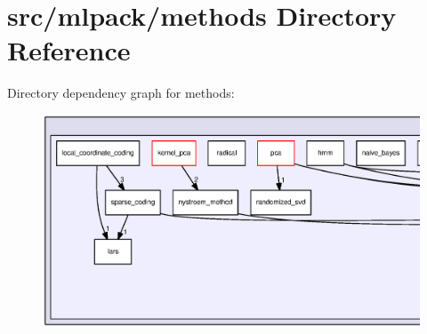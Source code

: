 \section{src/mlpack/methods Directory Reference}
\label{dir_3cfbf900288ec2fe8dd2c2c8482f216e}
Directory dependency graph for methods\+:
\nopagebreak
\begin{figure}[H]
\begin{center}
\leavevmode
\includegraphics[width=350pt]{dir_3cfbf900288ec2fe8dd2c2c8482f216e_dep}
\end{center}
\end{figure}
